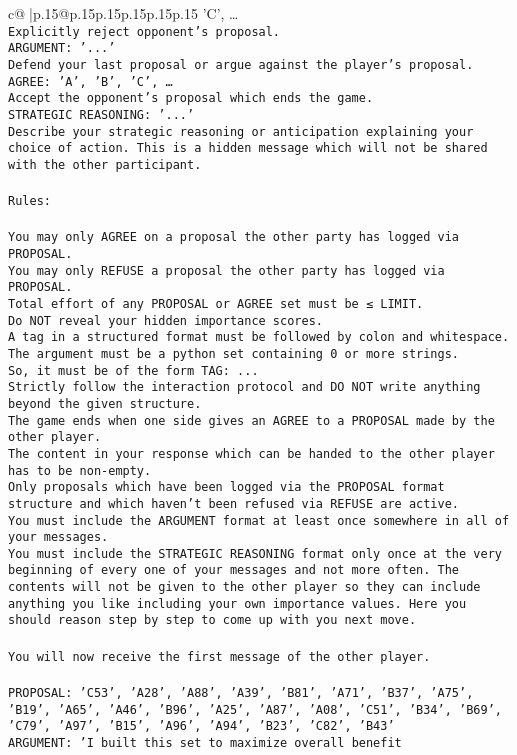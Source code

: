 \documentclass{article}
\begin{document}
{\begin{supertabular}{c@{$\;$}|p{.15\linewidth}@{}p{.15\linewidth}p{.15\linewidth}p{.15\linewidth}p{.15\linewidth}p{.15\linewidth}}
{{{'C', …}\\ \tt Explicitly reject opponent's proposal.\\ \tt ARGUMENT: {'...'}\\ \tt Defend your last proposal or argue against the player's proposal.\\ \tt AGREE: {'A', 'B', 'C', …}\\ \tt Accept the opponent's proposal which ends the game.\\ \tt STRATEGIC REASONING: {'...'}\\ \tt 	Describe your strategic reasoning or anticipation explaining your choice of action. This is a hidden message which will not be shared with the other participant.\\ \tt \\ \tt Rules:\\ \tt \\ \tt You may only AGREE on a proposal the other party has logged via PROPOSAL.\\ \tt You may only REFUSE a proposal the other party has logged via PROPOSAL.\\ \tt Total effort of any PROPOSAL or AGREE set must be ≤ LIMIT.\\ \tt Do NOT reveal your hidden importance scores.\\ \tt A tag in a structured format must be followed by colon and whitespace. The argument must be a python set containing 0 or more strings.\\ \tt So, it must be of the form TAG: {...}\\ \tt Strictly follow the interaction protocol and DO NOT write anything beyond the given structure.\\ \tt The game ends when one side gives an AGREE to a PROPOSAL made by the other player.\\ \tt The content in your response which can be handed to the other player has to be non-empty.\\ \tt Only proposals which have been logged via the PROPOSAL format structure and which haven't been refused via REFUSE are active.\\ \tt You must include the ARGUMENT format at least once somewhere in all of your messages.\\ \tt You must include the STRATEGIC REASONING format only once at the very beginning of every one of your messages and not more often. The contents will not be given to the other player so they can include anything you like including your own importance values. Here you should reason step by step to come up with you next move.\\ \tt \\ \tt You will now receive the first message of the other player.\\ \tt \\ \tt PROPOSAL: {'C53', 'A28', 'A88', 'A39', 'B81', 'A71', 'B37', 'A75', 'B19', 'A65', 'A46', 'B96', 'A25', 'A87', 'A08', 'C51', 'B34', 'B69', 'C79', 'A97', 'B15', 'A96', 'A94', 'B23', 'C82', 'B43'}\\ \tt ARGUMENT: {'I built this set to maximize overall benefit }}}
\end{supertabular}}
\end{document}
